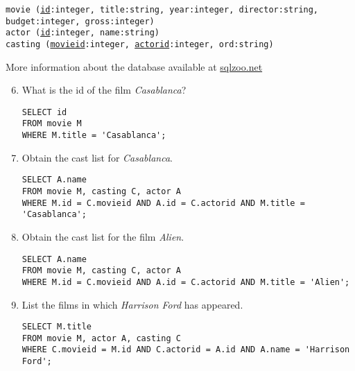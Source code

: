 \begin{enumerate}
\texttt{movie (\underline{id}:integer, title:string, year:integer, director:string, budget:integer, gross:integer)}\\
\texttt{actor (\underline{id}:integer, name:string)}\\
\texttt{casting (\underline{movieid}:integer, \underline{actorid}:integer, ord:string)}

More information about the database available at \href{http://sqlzoo.net/wiki/More_details_about_the_database.}{sqlzoo.net}

\begin{enumerate}
\setcounter{enumii}{5}
\item What is the id of the film \textit{Casablanca}?
\begin{lstlisting}
SELECT id
FROM movie M
WHERE M.title = 'Casablanca';
\end{lstlisting}
\item Obtain the cast list for \textit{Casablanca}.
\begin{lstlisting}
SELECT A.name
FROM movie M, casting C, actor A
WHERE M.id = C.movieid AND A.id = C.actorid AND M.title = 'Casablanca';
\end{lstlisting}
\item Obtain the cast list for the film \textit{Alien}.
\begin{lstlisting}
SELECT A.name
FROM movie M, casting C, actor A
WHERE M.id = C.movieid AND A.id = C.actorid AND M.title = 'Alien';
\end{lstlisting}
\item List the films in which \textit{Harrison Ford} has appeared.
\begin{lstlisting}
SELECT M.title
FROM movie M, actor A, casting C
WHERE C.movieid = M.id AND C.actorid = A.id AND A.name = 'Harrison Ford';
\end{lstlisting}
\end{enumerate}
\end{enumerate}
